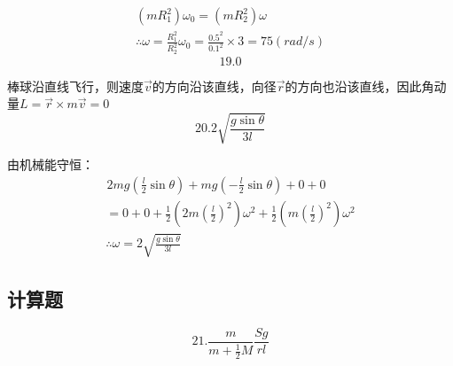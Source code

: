 \documentclass[blue, pad]{./templete/qyxfnote}
\begin{document}
			\begin{gather*}
			(mR_1^2)\omega_0=(mR_2^2)\omega\\
			\therefore \omega=\frac{R_1^2}{R_2^2}\omega_0=\frac{0.5^2}{0.1^2}\times 3=75(rad/s)
			\end{gather*}
			\[19.0\]\par
			棒球沿直线飞行，则速度$ \vec{v} $的方向沿该直线，向径$ \vec{r} $的方向也沿该直线，因此角动量$ L=\vec{r}\times m\vec{v}=0 $
			\[20.2\sqrt{\frac{g\sin\theta}{3l}}\]\par
			由机械能守恒：
			\begin{gather*}
			\hspace{1pt}2mg\left(\frac{l}{2}\sin\theta\right)+mg\left(-\frac{l}{2}\sin\theta\right)+0+0\\
			=0+0+\frac{1}{2}\left(2m\left(\frac{l}{2}\right)^2\right)\omega^2+\frac{1}{2}\left(m\left(\frac{l}{2}\right)^2\right)\omega^2\\
			\therefore \omega=2\sqrt{\frac{g\sin\theta}{3l}}
			\end{gather*}

		\subsection{计算题}
			\[21.\frac{m}{m+\frac{1}{2}M}\frac{Sg}{rl}\] 
			
\end{document}
